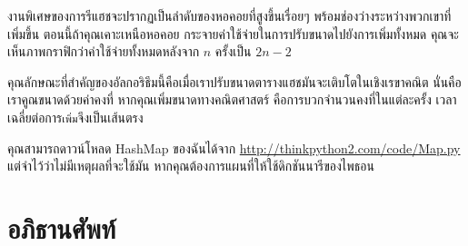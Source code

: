 งานพิเศษของการรีแฮชจะปรากฏเป็นลำดับของหอคอยที่สูงขึ้นเรื่อยๆ พร้อมช่องว่างระหว่างพวกเขาที่เพิ่มขึ้น 
ตอนนี้ถ้าคุณเคาะเหนือหอคอย กระจายค่าใช้จ่ายในการปรับขนาดไปยังการเพิ่มทั้งหมด 
คุณจะเห็นภาพกราฟิกว่าค่าใช้จ่ายทั้งหมดหลังจาก $n$ ครั้งเป็น $2n - 2$


คุณลักษณะที่สำคัญของอัลกอริธึมนี้คือเมื่อเราปรับขนาดตารางแฮชมันจะเติบโตในเชิงเรขาคณิต 
นั่นคือเราคูณขนาดด้วยค่าคงที่ หากคุณเพิ่มขนาดทางคณิตศาสตร์ คือการบวกจำนวนคงที่ในแต่ละครั้ง เวลาเฉลี่ยต่อการ{\tt เพิ่ม}จึงเป็นเส้นตรง


คุณสามารถดาวน์โหลด HashMap ของฉันได้จาก \url{http://thinkpython2.com/code/Map.py} 
แต่จำไว้ว่าไม่มีเหตุผลที่จะใช้มัน หากคุณต้องการแผนที่ให้ใช้ดิกชันนารีของไพธอน

\section{อภิธานศัพท์}

